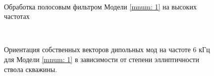 \documentclass[a4paper,11pt]{article}
\begin{document}
\begin{figure}[h]
	\centering
	\begin{minipage}{0.98\linewidth}
		\centering %
		 \\
	\end{minipage}
	\caption{Обработка полосовым фильтром Модели \ref{mnum: 1} на высоких частотах}
	\label{fig:bp_filter_high_graph_bs_hti_45_10x8}
\end{figure}
\begin{figure}[h]
	\centering
	\begin{minipage}{0.98\linewidth}
		\centering %
		 \\
	\end{minipage}
	\caption{Ориентация собственных векторов дипольных мод на частоте 6 кГц для Модели \ref{mnum: 1} в зависимости от степени эллиптичности ствола скважины.}
	\label{fig:ell_dep_eigenvec_ang_graph_bs_hti_45_10x8}
\end{figure}

%
\end{document}
